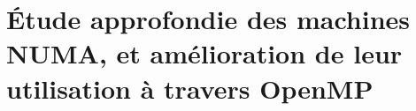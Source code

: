 \part{Étude approfondie des machines NUMA, et amélioration de leur utilisation à travers OpenMP}




